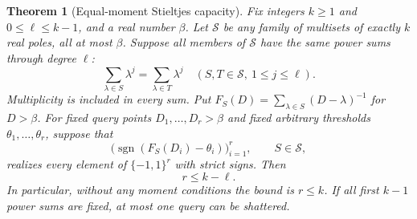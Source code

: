 \documentclass[11pt]{article}
\newtheorem{theorem}{Theorem}
\begin{document}
\begin{theorem}[Equal-moment Stieltjes capacity]
Fix integers $k\geq1$ and $0\leq\ell\leq k-1$, and a real number
$\beta$. Let $\mathcal S$ be any family of multisets of exactly $k$
real poles, all at most $\beta$. Suppose all members of $\mathcal S$
have the same power sums through degree $\ell$:
\[
 \sum_{\lambda\in S}\lambda^j
 =\sum_{\lambda\in T}\lambda^j
 \quad(S,T\in\mathcal S,\ 1\leq j\leq\ell).
\]
Multiplicity is included in every sum. Put
$F_S(D)=\sum_{\lambda\in S}(D-\lambda)^{-1}$ for $D>\beta$.
For fixed query points $D_1,\ldots,D_r>\beta$ and fixed arbitrary
thresholds $\theta_1,\ldots,\theta_r$, suppose that
\[
 \bigl(\operatorname{sgn}(F_S(D_i)-\theta_i)\bigr)_{i=1}^r,
 \qquad S\in\mathcal S,
\]
realizes every element of $\{-1,1\}^r$ with strict signs. Then
\[
 r\leq k-\ell.
\]
In particular, without any moment conditions the bound is $r\leq k$.
If all first $k-1$ power sums are fixed, at most one query can be
shattered.
\end{theorem}
\end{document}
